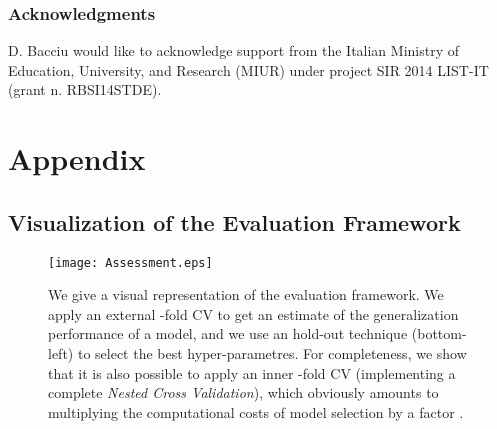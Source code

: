 \documentclass{article}
\begin{document}
\subsubsection*{Acknowledgments}
D. Bacciu would like to acknowledge support from the Italian Ministry of Education, University, and Research (MIUR) under project SIR 2014 LIST-IT (grant n. RBSI14STDE).




\newpage

\appendix
\section{Appendix}

\subsection{Visualization of the Evaluation Framework}
\label{appendix:evaluation-procedure}

\begin{figure}[ht]
   \texttt{[image: Assessment.eps]}
   \caption{We give a visual representation of the evaluation framework. We apply an external -fold CV to get an estimate of the generalization performance of a model, and we use an hold-out technique (bottom-left) to select the best hyper-parametres. For completeness, we show that it is also possible to apply an inner -fold CV (implementing a complete \textit{Nested Cross Validation}), which obviously amounts to multiplying the computational costs of model selection by a factor .}
   \label{fig:experimental-procedure}
\end{figure}

\newpage
\end{document}
